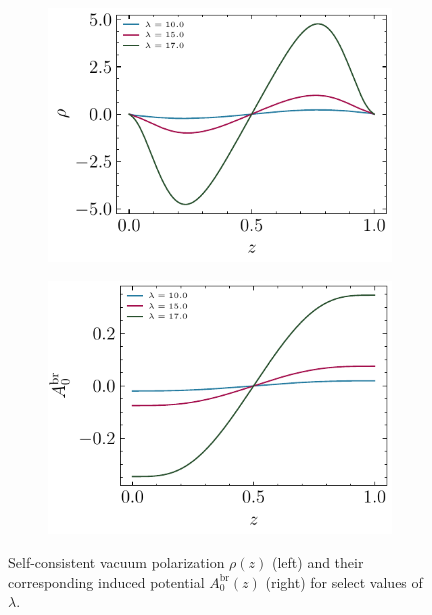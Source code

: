 \begin{figure} \begin{subfigure}{0.5\textwidth} \centering
\includegraphics[width=1\linewidth]{figures/dirichlet/vacuumPolarizationEvolution.pdf}
\label{fig:HadamardVacuumPolarization1}
\end{subfigure}
\hfill
\begin{subfigure}{0.5\textwidth} 
\centering
\includegraphics[width=1\linewidth]{figures/dirichlet/A0InducedEvolution.pdf} 
\label{fig:HadamardVacuumPolarization2} 
\end{subfigure}
\caption{Self-consistent vacuum polarization $\rho(z)$ (left) and their corresponding induced potential $A_0^\text{br}(z)$ (right) for select values of $\lambda$. } \label{fig:HadamardVacuumPolarization} \end{figure}


